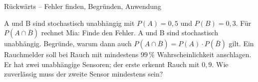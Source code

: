 \begin{aufgabe}{Rückwärts – Fehler finden, Begründen, Anwendung}
\begin{teile}
\teil A und B sind stochastisch unabhängig mit $P(A) = 0{,}5$ und $P(B) = 0{,}3$. Für $P(A \cap \overline{B})$ rechnet Mia:  Finde den Fehler.
\teil A und B sind stochastisch unabhängig. Begründe, warum dann auch $P(A \cap \overline{B}) = P(A) \cdot P(\overline{B})$ gilt.
\teil Ein Rauchmelder soll bei Rauch mit mindestens $99\,\%$ Wahrscheinlichkeit anschlagen. Er hat zwei unabhängige Sensoren; der erste erkennt Rauch mit $0{,}9$. Wie zuverlässig muss der zweite Sensor mindestens sein?
\end{teile}
\end{aufgabe}
